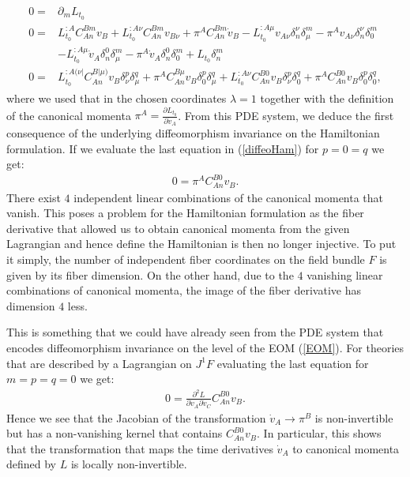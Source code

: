 \begin{align}\label{diffeoHam}
    \begin{aligned}
    0 = &\partial_m L_{t_0} \\
    0 = &L_{t_0}^{:A} C_{An}^{Bm} v_B + L_{t_0}^{:A\nu} C_{An}^{B m} v_{B\nu} + \pi^A C_{An}^{B m}\dot{v}_B - L_{t_0}^{:A \mu} v_{A\nu} \delta^{\nu}_n \delta^m_{\mu}
    - \pi^A v_{A\nu} \delta^{\nu}_n \delta^m_{0} \\
    &- L_{t_0}^{:A \mu} \dot{v}_A \delta^0_n \delta^m_{\mu}
    - \pi^A \dot{v}_A \delta^0_n \delta^m_0 + L_{t_0} \delta_n^m \\
    0 = &L_{t_0}^{:A (\nu \vert } C_{An}^{B \vert \mu)} v_B \delta_{\nu}^{p} \delta_{\mu}^{q}
    +\pi^A C_{An}^{B  \mu} v_B \delta_{0}^{p} \delta_{\mu}^{q}
    +L_{t_0}^{:A \nu } C_{An}^{B 0} v_B \delta_{\nu}^{p} \delta_{0}^{q}
    +\pi^A C_{An}^{B  0} v_B \delta_{0}^{p} \delta_{0}^{q},
    \end{aligned}
\end{align}
where we used that in the chosen coordinates $\lambda = 1$ together with the definition of the canonical momenta $\pi^A = \frac{\partial L_{t_0}}{\partial \dot{v}_A}$. 
From this PDE system, we deduce the first consequence of the underlying diffeomorphism invariance on the Hamiltonian formulation. If we evaluate the last equation in (\ref{diffeoHam}) for $p=0=q$ we get:
\begin{align}\label{ConstrPi}
    0=\pi^A C_{An}^{B0}v_B.
\end{align}
There exist $4$ independent linear combinations of the canonical momenta that vanish. This poses a problem for the Hamiltonian formulation as the fiber derivative that allowed us to obtain canonical momenta from the given Lagrangian and hence define the Hamiltonian is then no longer injective. To put it simply, the number of independent fiber coordinates on the field bundle $F$ is given by its fiber dimension. On the other hand, due to the $4$ vanishing linear combinations of canonical momenta, the image of the fiber derivative has dimension $4$ less.

This is something that we could have already seen from the PDE system that encodes diffeomorphism invariance on the level of the EOM (\ref{EOM}). For theories that are described by a Lagrangian on $J^1F$ evaluating the last equation for $m=p=q=0$ we get: 
\begin{align}\label{Constr1}
    0 = \frac{\partial^2 L}{\partial \dot{v}_A \partial \dot{v}_C } C_{An}^{B0} v_B.
\end{align}
Hence we see that the Jacobian of the transformation $\dot{v}_A \rightarrow \pi^B$ is non-invertible but has a non-vanishing kernel that contains $C_{An}^{B0}v_B$. In particular, this shows that the transformation that maps the time derivatives $\dot{v}_A$ to canonical momenta defined by $L$ is locally non-invertible. 


